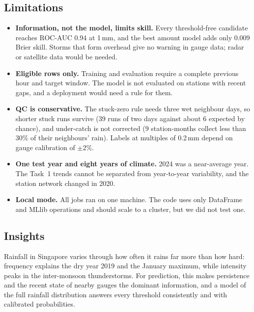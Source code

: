 \documentclass[lang=en,11pt,a4paper,bibend=bibtex]{elegantpaper}
\newcommand{\mm}{\,mm}
\begin{document}
\subsection{Limitations}
\begin{itemize}[leftmargin=1.5em,itemsep=3pt]
\item \textbf{Information, not the model, limits skill.} Every threshold-free candidate reaches ROC-AUC 0.94 at 1\mm, and the best amount model adds only 0.009 Brier skill. Storms that form overhead give no warning in gauge data; radar or satellite data would be needed.
\item \textbf{Eligible rows only.} Training and evaluation require a complete previous hour and target window. The model is not evaluated on stations with recent gaps, and a deployment would need a rule for them.
\item \textbf{QC is conservative.} The stuck-zero rule needs three wet neighbour days, so shorter stuck runs survive (39 runs of two days against about 6 expected by chance), and under-catch is not corrected (9 station-months collect less than 30\% of their neighbours' rain). Labels at multiples of 0.2\mm{} depend on gauge calibration of $\pm2\%$.
\item \textbf{One test year and eight years of climate.} 2024 was a near-average year. The Task~1 trends cannot be separated from year-to-year variability, and the station network changed in 2020.
\item \textbf{Local mode.} All jobs ran on one machine. The code uses only DataFrame and MLlib operations and should scale to a cluster, but we did not test one.
\end{itemize}

\subsection{Insights}
Rainfall in Singapore varies through how often it rains far more than how hard: frequency explains the dry year 2019 and the January maximum, while intensity peaks in the inter-monsoon thunderstorms. For prediction, this makes persistence and the recent state of nearby gauges the dominant information, and a model of the full rainfall distribution answers every threshold consistently and with calibrated probabilities.
\end{document}
